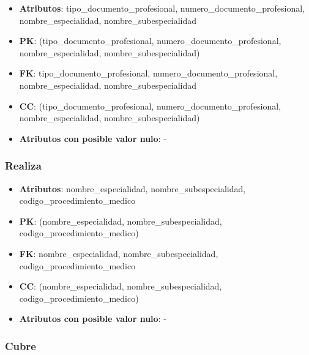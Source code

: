 \documentclass[a4paper,11pt]{article}
\begin{document}
\begin{itemize}

\item 
\textbf{Atributos}: tipo\_documento\_profesional, numero\_documento\_profesional, nombre\_especialidad,
nombre\_subespecialidad

\item 
\textbf{PK}: (tipo\_documento\_profesional, numero\_documento\_profesional, nombre\_especialidad,
nombre\_subespecialidad)

\item
\textbf{FK}: tipo\_documento\_profesional, numero\_documento\_profesional, nombre\_especialidad,
nombre\_subespecialidad

\item 
\textbf{CC}: (tipo\_documento\_profesional, numero\_documento\_profesional, nombre\_especialidad,
nombre\_subespecialidad)

\item 
\textbf{Atributos con posible valor nulo}: -

\end{itemize}
\subsubsection{\textbf{Realiza}}

\begin{itemize}

\item 
\textbf{Atributos}: nombre\_especialidad, nombre\_subespecialidad, codigo\_procedimiento\_medico

\item 
\textbf{PK}: (nombre\_especialidad, nombre\_subespecialidad, codigo\_procedimiento\_medico)

\item
\textbf{FK}: nombre\_especialidad, nombre\_subespecialidad, codigo\_procedimiento\_medico 

\item 
\textbf{CC}: (nombre\_especialidad, nombre\_subespecialidad, codigo\_procedimiento\_medico)

\item 
\textbf{Atributos con posible valor nulo}: -

\end{itemize}
\subsubsection{\textbf{Cubre}}
\end{document}
